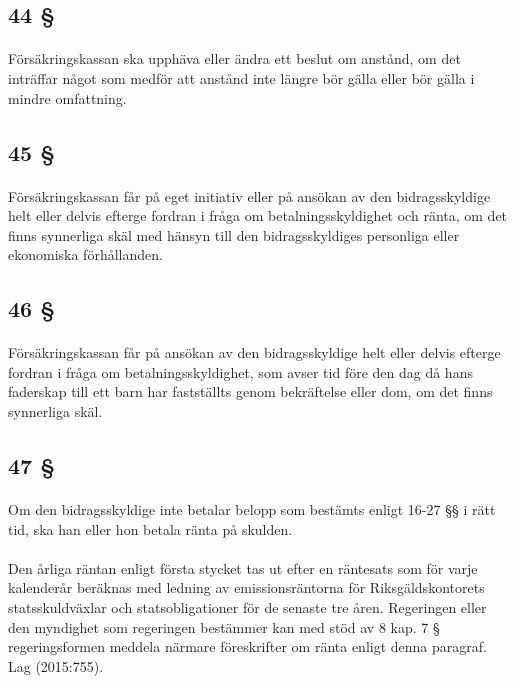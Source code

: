 \documentclass[a4paper,notitlepage,openany,10pt]{book}
\begin{document}
\subsection*{44 §}
\paragraph*{}
Försäkringskassan ska upphäva eller ändra ett beslut om anstånd, om det inträffar något som medför att anstånd inte längre bör gälla eller bör gälla i mindre omfattning.
\subsection*{45 §}
\paragraph*{}
Försäkringskassan får på eget initiativ eller på ansökan av den bidragsskyldige helt eller delvis efterge fordran i fråga om betalningsskyldighet och ränta, om det finns synnerliga skäl med hänsyn till den bidragsskyldiges personliga eller ekonomiska förhållanden.
\subsection*{46 §}
\paragraph*{}
Försäkringskassan får på ansökan av den bidragsskyldige helt eller delvis efterge fordran i fråga om betalningsskyldighet, som avser tid före den dag då hans faderskap till ett barn har fastställts genom bekräftelse eller dom, om det finns synnerliga skäl.
\subsection*{47 §}
\paragraph*{}
Om den bidragsskyldige inte betalar belopp som bestämts enligt 16-27 §§ i rätt tid, ska han eller hon betala ränta på skulden.
\paragraph*{}
Den årliga räntan enligt första stycket tas ut efter en räntesats som för varje kalenderår beräknas med ledning av emissionsräntorna för Riksgäldskontorets statsskuldväxlar och statsobligationer för de senaste tre åren. Regeringen eller den myndighet som regeringen bestämmer kan med stöd av 8 kap. 7 § regeringsformen meddela närmare föreskrifter om ränta enligt denna paragraf.
Lag (2015:755).
\end{document}
